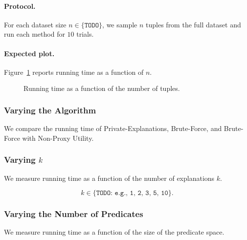 \paragraph{Protocol.}
For each dataset size $n \in \{\texttt{TODO}\}$, we sample $n$ tuples from the
full dataset and run each method for $10$ trials.

\paragraph{Expected plot.}
Figure~\ref{fig:runtime-tuples} reports running time as a function of $n$.

\begin{figure}[t]
    \centering
    \caption{Running time as a function of the number of tuples.}
    \label{fig:runtime-tuples}
\end{figure}

\subsubsection{Varying the Algorithm}
\label{subsubsec:runtime-algorithm}

We compare the running time of Private-Explanations, Brute-Force, and Brute-Force
with Non-Proxy Utility.


\subsubsection{Varying $k$}
\label{subsubsec:runtime-k}

We measure running time as a function of the number of explanations $k$.

\[
    k \in \{\texttt{TODO: e.g., 1, 2, 3, 5, 10}\}.
\]


\subsubsection{Varying the Number of Predicates}
\label{subsubsec:runtime-predicates}

We measure running time as a function of the size of the predicate space.


